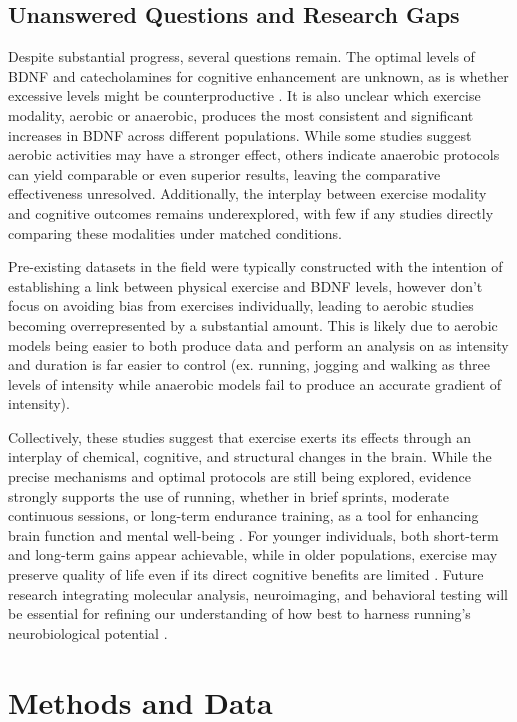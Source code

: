 \documentclass[runningheads]{llncs}
\begin{document}
\subsection{Unanswered Questions and Research Gaps}
Despite substantial progress, several questions remain. The optimal levels of BDNF and catecholamines for cognitive enhancement are unknown, as is whether excessive levels might be counterproductive \cite{winter2007high}. It is also unclear which exercise modality, aerobic or anaerobic, produces the most consistent and significant increases in BDNF across different populations. While some studies suggest aerobic activities may have a stronger effect, others indicate anaerobic protocols can yield comparable or even superior results, leaving the comparative effectiveness unresolved. Additionally, the interplay between exercise modality and cognitive outcomes remains underexplored, with few if any studies directly comparing these modalities under matched conditions. 

Pre-existing datasets in the field were typically constructed with the intention of establishing a link between physical exercise and BDNF levels, however don't focus on avoiding bias from exercises individually, leading to aerobic studies becoming overrepresented by a substantial amount. This is likely due to aerobic models being easier to both produce data and perform an analysis on as intensity and duration is far easier to control (ex. running, jogging and walking as three levels of intensity while anaerobic models fail to produce an accurate gradient of intensity).

Collectively, these studies suggest that exercise exerts its effects through an interplay of chemical, cognitive, and structural changes in the brain. While the precise mechanisms and optimal protocols are still being explored, evidence strongly supports the use of running, whether in brief sprints, moderate continuous sessions, or long-term endurance training, as a tool for enhancing brain function and mental well-being \cite{vivar2017running}. For younger individuals, both short-term and long-term gains appear achievable, while in older populations, exercise may preserve quality of life even if its direct cognitive benefits are limited \cite{batmyagmar2019high}. Future research integrating molecular analysis, neuroimaging, and behavioral testing will be essential for refining our understanding of how best to harness running’s neurobiological potential \cite{roeh2021effects}.

\section{Methods and Data}
\end{document}
